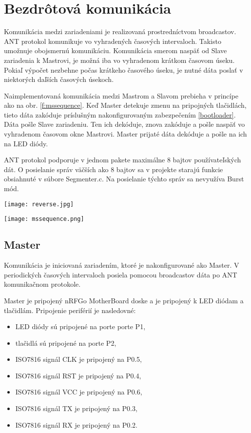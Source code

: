 \documentclass[12pt,a4wide,oneside,openright]{report}
\begin{document}
\section{Bezdrôtová komunikácia}
Komunikácia medzi zariadeniami je realizovaná prostredníctvom broadcastov. 
ANT protokol komunikuje vo vyhradených časových intervaloch. Takisto umožnuje obojsmernú komunikáciu. Komunikácia smerom naspäť od Slave zariadenia k Mastrovi, je možná iba vo vyhradenom krátkom časovom úseku. Pokiaľ výpočet nezbehne počas krátkeho časového úseku, je nutné dáta poslať v niektorých daľších časových úsekoch.

Naimplementovaná komunikácia medzi Mastrom a Slavom prebieha v princípe ako na obr. \ref{f:mssequence}. Keď Master detekuje zmenu na pripojných tlačidlách, tieto dáta zakóduje príslušným nakonfigurovaným zabezpečením \ref{bootloader}. Dáta pošle Slave zariadeniu. Ten ich dekóduje, znova zakóduje a pošle naspäť vo vyhradenom časovom okne Mastrovi. Master prijaté dáta dekóduje a pošle na ich na LED diódy.

ANT protokol podporuje v jednom pakete maximálne 8 bajtov používateľských dát. O posielanie správ väčších ako 8 bajtov sa v projekte starajú funkcie obsiahnuté v súbore Segmenter.c. Na posielanie týchto správ sa nevyužíva Burst mód.

	\begin{figure*}[h]
		\centering
		\texttt{[image: reverse.jpg]}
		\caption{Obojsmerná komunikácia po ANT protokole \cite{ANT}.}
		\label{f:reverse_send}
	\end{figure*}


	\begin{figure*}[h]
		\centering
		\texttt{[image: mssequence.png]}
		\caption{Komunikácia medzi mastrom a slavom.}
		\label{f:mssequence}
	\end{figure*}

\subsection{Master}
	Komunikácia je iniciovaná zariadením, ktoré je nakonfigurované ako Master.
	V periodických časových intervaloch posiela pomocou broadcastov dáta po ANT komunikačnom protokole.
	
	Master je pripojený nRFGo MotherBoard doske a je pripojený k LED diódam a tlačidlám. 
	Pripojenie periférií je nasledovné:
	\begin{itemize}
		\item LED diódy sú pripojené na porte porte P1,
		\item tlačidlá sú pripojené na porte P2,
		\item ISO7816 signál CLK je pripojený na P0.5,
		\item ISO7816 signál RST je pripojený na P0.4,
		\item ISO7816 signál VCC je pripojený na P0.6,
		\item ISO7816 signál TX je pripojený na P0.3,
		\item ISO7816 signál RX je pripojený na P0.2.
	\end{itemize}
\end{document}
